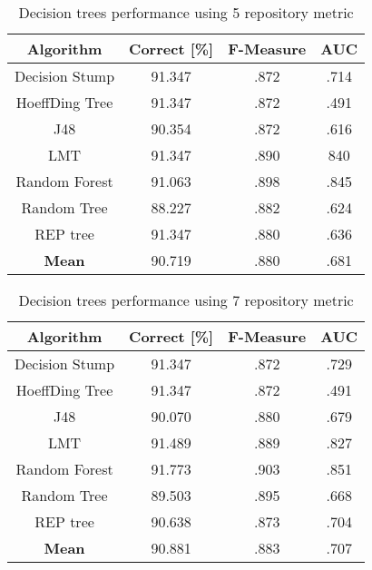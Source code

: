 \begin{table}[h!]
\centering
\begin{tabular}{ |c|c|c|c| }
 \hline
 \textbf{Algorithm} & \textbf{Correct [\%]} & \textbf{F-Measure} & \textbf{AUC}  \\
 \hline
 Decision Stump & 91.347 & .872 & .714    \\
 \hline
 HoeffDing Tree &  91.347 & .872 & .491   \\
 \hline
  J48 & 90.354 & .872 & .616\\
 \hline
  LMT & 91.347 & .890 & 840  \\
 \hline
  Random Forest & 91.063 & .898 & .845 \\
 \hline
  Random Tree & 88.227 & .882 & .624 \\
 \hline
 REP tree  & 91.347 & .880 & .636 \\
 \hline
 \textbf{Mean}  & 90.719 & .880 & .681 \\
 \hline

\end{tabular}
\caption{Decision trees performance using 5 repository metric}
\label{table:DT_5}
\end{table}

\begin{table}[h!]
\centering
\begin{tabular}{ |c|c|c|c| }
 \hline
 \textbf{Algorithm} & \textbf{Correct [\%]} & \textbf{F-Measure} & \textbf{AUC}  \\
 \hline
 Decision Stump & 91.347 & .872 & .729    \\
 \hline
 HoeffDing Tree &  91.347 & .872 & .491   \\
 \hline
  J48 & 90.070 & .880 & .679\\
 \hline
  LMT & 91.489 & .889 & .827  \\
 \hline
  Random Forest & 91.773 & .903 & .851 \\
 \hline
  Random Tree & 89.503 & .895 & .668 \\
 \hline
 REP tree  & 90.638 & .873 & .704 \\
 \hline
 \textbf{Mean}  & 90.881 & .883 & .707 \\
 \hline

\end{tabular}
\caption{Decision trees performance using 7 repository metric}
\label{table:DT_7}
\end{table}
